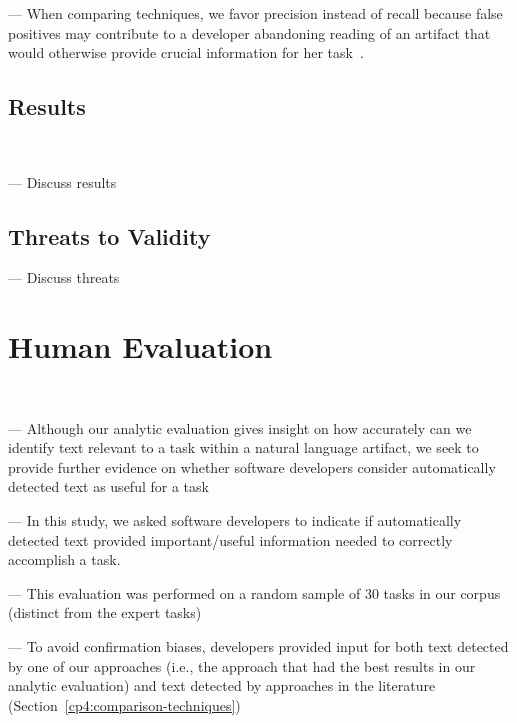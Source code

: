 \vspace{3mm}

--- When comparing techniques, we favor precision instead of recall because false positives may contribute to a developer abandoning reading of an artifact that would otherwise provide crucial information for her task~\cite{Rastkar2010}.


\subsection{Results}
\textcolor{white}{force ident} %

--- Discuss results \vspace{3mm}

\subsection{Threats to Validity}

--- Discuss threats \vspace{3mm}

\clearpage


\section{Human Evaluation}
\textcolor{white}{force ident} %


--- Although our analytic evaluation gives insight on how accurately can we identify text relevant to a task within a natural language artifact, we seek to provide further evidence on whether software developers consider automatically detected text as useful for a task 

--- In this study, we asked software developers to indicate if automatically detected text provided important/useful information needed to correctly accomplish a task.

--- This evaluation was performed on a random sample of 30 tasks in our corpus (distinct from the expert tasks)

--- To avoid confirmation biases, developers provided input for both text detected by one of our approaches (i.e., the approach that had the best results in our analytic evaluation) and text detected by approaches in the literature (Section~\ref{cp4:comparison-techniques})




